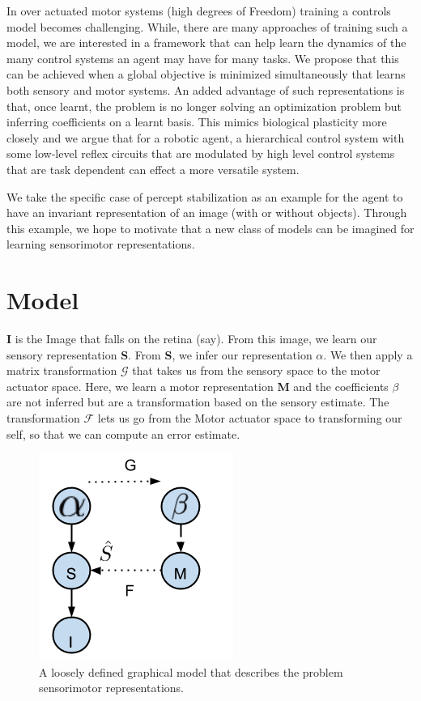\documentclass[conference]{IEEEtran}
\begin{document}
In over actuated motor systems (high degrees of Freedom) training a controls model becomes challenging. While, there are many approaches of training such a model, we are interested in a framework that can help learn the dynamics of the many control systems an agent may have for many tasks. We propose that this can be achieved when a global objective is minimized simultaneously that learns  both sensory and motor systems. An added advantage of such representations is that, once learnt, the problem is no longer solving an optimization problem but inferring coefficients on a learnt basis. This mimics biological plasticity \cite{kandel2000principles} more closely and we argue that for a robotic agent, a hierarchical control system with some low-level reflex circuits that are modulated by high level control systems that are task dependent can effect a more versatile system.

We take the specific case of percept stabilization as an example for the agent to have an invariant representation of an image (with or without objects). Through this example, we hope to motivate that a new class of models can be imagined for learning sensorimotor representations.

\section{Model}
\textbf{I} is the Image that falls on the retina (say). From this image, we learn our sensory representation \textbf{S}. From \textbf{S}, we infer our representation \textbf{$\alpha$}. We then apply a matrix transformation $\mathcal{G}$ that takes us from the sensory space to the motor actuator space. Here, we learn a motor representation \textbf{M} and the coefficients \textbf{$\beta$} are not inferred but are a transformation based on the sensory estimate. The transformation $\mathcal{F}$ lets us go from the Motor actuator space to transforming our self, so that we can compute an error estimate. 

\begin{figure}
\includegraphics[scale=0.6]{sesemo1.png}
\caption{A loosely defined graphical model that describes the problem sensorimotor representations. }
\end{figure}
\end{document}
